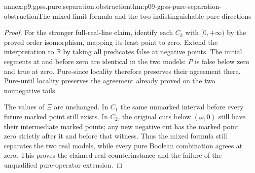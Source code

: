 \begin{annexitem}{annex:p9.gpss.pure.separation.obstruction}{thm:p09-gpss-pure-separation-obstruction}{The mixed limit formula and the two indistinguishable pure directions}
\begin{proof}
For the stronger
full-real-line
claim, identify
each \(C_k\)
with \([0,+\infty)\)
by the proved
order isomorphism,
mapping its
least point
to zero.
Extend the
interpretation
to \(\mathbb R\)
by taking
all predicates
false at
negative points.
The initial
segments at
and before
zero are
identical in
the two models:
\(P\) is
false below
zero and true
at zero.
Pure-since
locality therefore
preserves their
agreement there.
Pure-until
locality preserves
the agreement
already proved
on the two
nonnegative
tails.

The values
of \(\Xi\)
are unchanged.
In \(C_1\)
the same
unmarked interval
before every
future marked
point still
exists. In
\(C_2\),
the original
cuts below
\((\omega,0)\)
still have
their intermediate
marked points;
any new
negative cut
has the
marked point
zero strictly
after it and
before that
witness.
Thus the
mixed formula
still separates
the two real
models, while
every pure
Boolean combination
agrees at
zero. This
proves the
claimed real
counterinstance
and the
failure of
the unqualified
pure-operator
extension.
\end{proof}
\end{annexitem}
